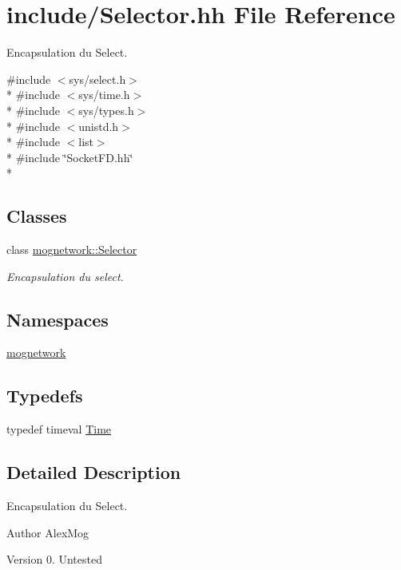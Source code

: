 \hypertarget{_selector_8hh}{\section{include/\-Selector.hh File Reference}
\label{_selector_8hh}
}


Encapsulation du Select.  


{\ttfamily \#include $<$sys/select.\-h$>$}\\*
{\ttfamily \#include $<$sys/time.\-h$>$}\\*
{\ttfamily \#include $<$sys/types.\-h$>$}\\*
{\ttfamily \#include $<$unistd.\-h$>$}\\*
{\ttfamily \#include $<$list$>$}\\*
{\ttfamily \#include \char`\"{}Socket\-F\-D.\-hh\char`\"{}}\\*
\subsection*{Classes}
\begin{DoxyCompactItemize}
\item 
class \hyperlink{classmognetwork_1_1_selector}{mognetwork\-::\-Selector}
\begin{DoxyCompactList}\small\item\em Encapsulation du select. \end{DoxyCompactList}\end{DoxyCompactItemize}
\subsection*{Namespaces}
\begin{DoxyCompactItemize}
\item 
\hyperlink{namespacemognetwork}{mognetwork}
\end{DoxyCompactItemize}
\subsection*{Typedefs}
\begin{DoxyCompactItemize}
\item 
typedef timeval \hyperlink{_selector_8hh_af47ac292ef7224cf549b944d138ba4ae}{Time}
\end{DoxyCompactItemize}


\subsection{Detailed Description}
Encapsulation du Select. \begin{DoxyAuthor}{Author}
Alex\-Mog 
\end{DoxyAuthor}
\begin{DoxyVersion}{Version}
0.  Untested 
\end{DoxyVersion}


